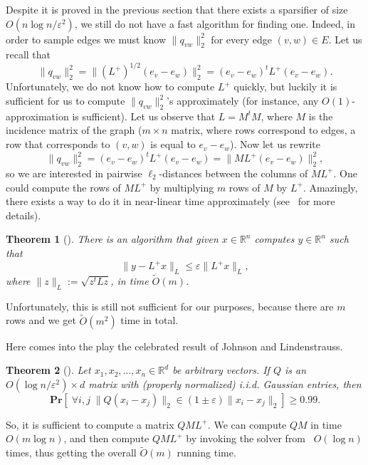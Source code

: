 \documentclass[12pt]{article}
\newcommand{\Rbb}{\mathbb{R}}
\newcommand{\eps}{\varepsilon}
\newtheorem{theorem}{Theorem}
\begin{document}
    Despite it is proved in the previous section that there exists a sparsifier of size
    $O(n \log n / \eps^2)$, we still do not have a fast algorithm for finding one.
    Indeed, in order to sample edges we must know $\|q_{vw}\|_2^2$ for every edge
    $(v, w) \in E$. Let us recall that
    $$
        \|q_{vw}\|_2^2 = \|(L^+)^{1/2} (e_v - e_w)\|_2^2 =
        (e_v - e_w)^t L^+ (e_v - e_w).
    $$
    Unfortunately, we do not know how to compute $L^+$ quickly, but luckily it is sufficient
    for us to compute $\|q_{vw}\|_2^2$'s approximately (for instance, any
    $O(1)$-approximation is sufficient).
    Let us observe that $L = M^t M$, where $M$ is the incidence matrix of the graph
    ($m \times n$ matrix, where rows correspond to edges, a row that corresponds to
    $(v, w)$ is equal to $e_v - e_w$). Now let us rewrite
    $$
        \|q_{vw}\|_2^2 = (e_v - e_w)^t L^+ (e_v - e_w) =
        \|ML^+(e_v - e_w)\|_2^2,
    $$
    so we are interested in pairwise $\ell_2$-distances between the columns of $ML^+$.
    One could compute the rows of $ML^+$ by multiplying $m$ rows of $M$ by $L^+$.
    Amazingly, there exists a way to do it in near-linear time approximately
    (see~\cite{KMP10} for more details).
    \begin{theorem}[\cite{KMP10}]
        There is an algorithm that given $x \in \Rbb^n$ computes $y \in \Rbb^n$ such that
        $$
            \|y - L^+ x\|_L \leq \eps \|L^+ x\|_L,
        $$
        where $\|z\|_L := \sqrt{z^t L z}$, in time $\tilde{O}(m)$.
    \end{theorem}
    Unfortunately, this is still not sufficient
    for our purposes, because there are $m$ rows and we get $\tilde{O}(m^2)$ time in total.

    Here comes into the play the celebrated result of Johnson and Lindenstrauss.
    \begin{theorem}[\cite{DG03}]
        Let $x_1, x_2, \ldots, x_n \in \Rbb^d$ be arbitrary vectors.
        If $Q$ is an $O(\log n / \eps^2) \times d$ matrix with (properly normalized)
        i.i.d. Gaussian entries, then
        $$
            \mathbf{Pr}[\;\forall i, j \; \|Q(x_i - x_j)\|_2 \in
            (1 \pm \eps) \|x_i - x_j\|_2] \geq 0.99.
        $$
    \end{theorem}
    So, it is sufficient to compute a matrix $QML^+$. We can compute $QM$ in time
    $O(m \log n)$, and then compute $QML^+$ by invoking the solver from~\cite{KMP10}
    $O(\log n)$ times, thus getting the overall $\tilde{O}(m)$ running time.
\end{document}

